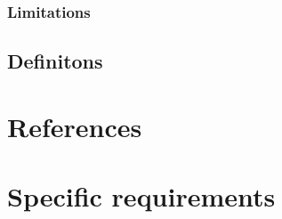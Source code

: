 \documentclass{scrreprt}
\begin{document}
\subsection{Limitations}


\section{Definitons}


\chapter{References}


\chapter{Specific requirements}
\end{document}
